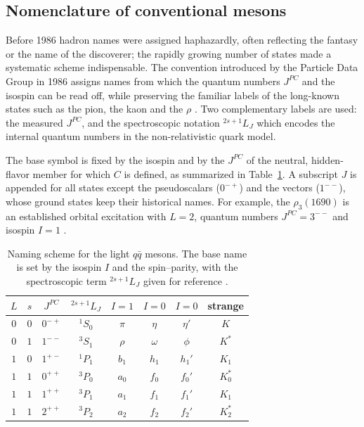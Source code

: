 \subsection{Nomenclature of conventional mesons}
\label{subsec:nomenclature}

Before 1986 hadron names were assigned haphazardly, often reflecting the fantasy or
the name of the discoverer; the rapidly growing number of states made a systematic
scheme indispensable. The convention introduced by the Particle Data Group in 1986
assigns names from which the quantum numbers $J^{PC}$ and the isospin can be read off,
while preserving the familiar labels of the long-known states such as the pion, the
kaon and the $\rho$ \cite[Ch.~4]{Amsler2018}. Two complementary labels are used: the
measured $J^{PC}$, and the spectroscopic notation $^{2s+1}L_J$ which encodes the
internal quantum numbers in the non-relativistic quark model.

The base symbol is fixed by the isospin and by the $J^{PC}$ of the neutral,
hidden-flavor member for which $C$ is defined, as summarized in
Table~\ref{tab:meson_naming}. A subscript $J$ is appended for all states except the
pseudoscalars ($0^{-+}$) and the vectors ($1^{--}$), whose ground states keep their
historical names. For example, the $\rho_3(1690)$ is an established orbital
excitation with $L = 2$, quantum numbers $J^{PC} = 3^{--}$ and isospin $I = 1$
\cite[Ch.~4]{Amsler2018}.

\begin{table}[t]
    \centering
    \caption{Naming scheme for the light $q\bar q$ mesons. The base name is set by
    the isospin $I$ and the spin--parity, with the spectroscopic term $^{2s+1}L_J$
    given for reference \cite[Ch.~4]{Amsler2018}.}
    \label{tab:meson_naming}
    \begin{tabular}{cccccccc}
        \hline
        $L$ & $s$ & $J^{PC}$ & $^{2s+1}L_J$ &
        $I = 1$ & $I = 0$ & $I = 0$ & strange \\
        \hline
        $0$ & $0$ & $0^{-+}$ & $^1S_0$ & $\pi$ & $\eta$  & $\eta'$ & $K$    \\
        $0$ & $1$ & $1^{--}$ & $^3S_1$ & $\rho$ & $\omega$ & $\phi$ & $K^*$  \\
        $1$ & $0$ & $1^{+-}$ & $^1P_1$ & $b_1$ & $h_1$   & $h_1'$  & $K_1$  \\
        $1$ & $1$ & $0^{++}$ & $^3P_0$ & $a_0$ & $f_0$   & $f_0'$  & $K_0^*$\\
        $1$ & $1$ & $1^{++}$ & $^3P_1$ & $a_1$ & $f_1$   & $f_1'$  & $K_1$  \\
        $1$ & $1$ & $2^{++}$ & $^3P_2$ & $a_2$ & $f_2$   & $f_2'$  & $K_2^*$\\
        \hline
    \end{tabular}
\end{table}

